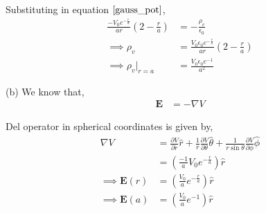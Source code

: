 \documentclass[12pt]{article}
\providecommand{\brak}[1]{\ensuremath{\left(#1\right)}}
\begin{document}
Substituting in equation $\ref{gauss_pot}$,
\begin{align*}
    \frac{-V_0 e^{-\frac{r}{a}}}{ar} \brak{2 - \frac{r}{a}} &= -\frac{\rho_v}{\epsilon_0}\\
    \implies \rho_v &= \frac{V_0 \epsilon_0 e^{-\frac{r}{a}}}{ar} \brak{2 - \frac{r}{a}}\\
    \implies \rho_v \Biggr|_{r = a} &= \frac{V_0 \epsilon_0 e^{-1}}{a^2}
\end{align*}

(b) We know that,
\begin{align*}
    \mathbf{E} &= -\nabla V
\end{align*}

Del operator in spherical coordinates is given by,
\begin{align*}
    \nabla V &= \frac{\partial V}{\partial r} \hat{r} + \frac{1}{r} \frac{\partial V}{\partial \theta} \hat{\theta} + \frac{1}{r \sin \theta} \frac{\partial V}{\partial \phi} \hat{\phi}\\
    &= \brak{\frac{-1}{a} V_0 e^{-\frac{r}{a}}} \hat{r}\\
    \implies \mathbf{E}\brak{r} &= \brak{\frac{V_0}{a} e^{-\frac{r}{a}}} \hat{r}\\
    \implies \mathbf{E}\brak{a} &= \brak{\frac{V_0}{a} e^{-1}} \hat{r}
\end{align*}
\end{document}
